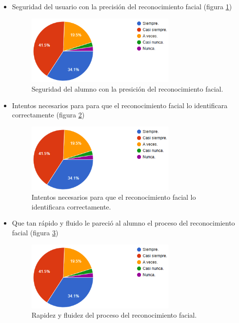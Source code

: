 \begin{itemize}
	\item Seguridad del usuario con la precisión del reconocimiento facial (figura \ref{fig:SPRF})
	\begin{figure}[H]
		\centering
		\includegraphics[width=0.7\textwidth]{images/FRF.png}
		\caption{Seguridad del alumno con la presición del reconocimiento facial.}
		\label{fig:SPRF}
	\end{figure}
	\item Intentos necesarios para para que el reconocimiento facial lo identificara correctamente (figura \ref{fig:IRF})
	\begin{figure}[H]
		\centering
		\includegraphics[width=0.7\textwidth]{images/FRF.png}
		\caption{Intentos necesarios para que el reconocimiento facial lo identificara correctamente.}
		\label{fig:IRF}
	\end{figure}
	\newpage
	
	\item Que tan rápido y fluido le pareció al alumno el proceso del reconocimiento facial (figura \ref{fig:FRRF})
	\begin{figure}[H]
		\centering
		\includegraphics[width=0.7\textwidth]{images/FRF.png}
		\caption{Rapidez y fluidez del proceso del reconocimiento facial.}
		\label{fig:FRRF}
	\end{figure}
	

\end{itemize}
